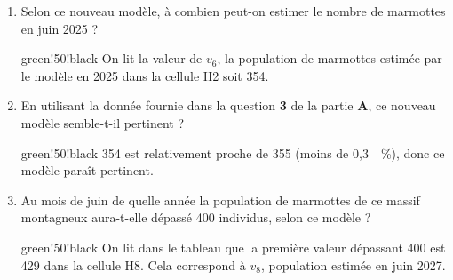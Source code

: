 \documentclass[10pt]{article}
\providecommand{\np}[2][]{{#2~#1}}
\begin{document}
\begin{enumerate}
\begin{center}
\tabcolwidth{1cm} 
\end{center}	

		\begin{enumerate}
			\item Selon ce nouveau modèle, à combien peut-on estimer le nombre de marmottes en juin 2025 ?
			
			\begin{color}{green!50!black}
			On lit la valeur de $v_{6}$, la population de marmottes estimée par le modèle en 2025 dans la cellule {\helvbx H2} soit 354.
			\end{color}
			
			\item En utilisant la donnée fournie dans la question \textbf{3} de la partie \textbf{A}, ce nouveau modèle semble-t-il pertinent ?
			
			\begin{color}{green!50!black}
			354 est relativement proche de 355 (moins de \np{0,3}~\%), donc ce modèle paraît pertinent.
			\end{color}
			
			\item Au mois de juin de quelle année la population de marmottes de ce massif montagneux aura-t-elle dépassé 400 individus, selon ce modèle ?
			
			\begin{color}{green!50!black}
			On lit dans le tableau que la première valeur dépassant 400 est 429 dans la cellule {\helvbx H8}. Cela correspond à $v_8$, population estimée en juin 2027.
			\end{color}
			
			
		\end{enumerate}
	\end{enumerate}
\end{document}
